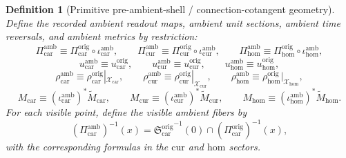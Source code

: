\documentclass[11pt]{article}
\newcommand{\TensorAmbientSpace}{\mathcal X_{\mathrm{car}}}
\newcommand{\CurAmbientSpace}{\mathcal X_{\mathrm{cur}}}
\newcommand{\HomAmbientSpace}{\mathcal X_{\mathrm{hom}}}
\newcommand{\TensorAmbientRead}{\Pi_{\mathrm{car}}^{\mathrm{amb}}}
\newcommand{\CurAmbientRead}{\Pi_{\mathrm{cur}}^{\mathrm{amb}}}
\newcommand{\HomAmbientRead}{\Pi_{\mathrm{hom}}^{\mathrm{amb}}}
\newcommand{\TensorAmbientUnit}{u_{\mathrm{car}}^{\mathrm{amb}}}
\newcommand{\CurAmbientUnit}{u_{\mathrm{cur}}^{\mathrm{amb}}}
\newcommand{\HomAmbientUnit}{u_{\mathrm{hom}}^{\mathrm{amb}}}
\newcommand{\TensorAmbientTimeRev}{\rho_{\mathrm{car}}^{\mathrm{amb}}}
\newcommand{\CurAmbientTimeRev}{\rho_{\mathrm{cur}}^{\mathrm{amb}}}
\newcommand{\HomAmbientTimeRev}{\rho_{\mathrm{hom}}^{\mathrm{amb}}}
\newcommand{\TensorAmbientMetric}{M_{\mathrm{car}}}
\newcommand{\CurAmbientMetric}{M_{\mathrm{cur}}}
\newcommand{\HomAmbientMetric}{M_{\mathrm{hom}}}
\newcommand{\TensorOriginRead}{\Pi_{\mathrm{car}}^{\mathrm{orig}}}
\newcommand{\CurOriginRead}{\Pi_{\mathrm{cur}}^{\mathrm{orig}}}
\newcommand{\HomOriginRead}{\Pi_{\mathrm{hom}}^{\mathrm{orig}}}
\newcommand{\TensorOriginUnit}{u_{\mathrm{car}}^{\mathrm{orig}}}
\newcommand{\CurOriginUnit}{u_{\mathrm{cur}}^{\mathrm{orig}}}
\newcommand{\HomOriginUnit}{u_{\mathrm{hom}}^{\mathrm{orig}}}
\newcommand{\TensorOriginTimeRev}{\rho_{\mathrm{car}}^{\mathrm{orig}}}
\newcommand{\CurOriginTimeRev}{\rho_{\mathrm{cur}}^{\mathrm{orig}}}
\newcommand{\HomOriginTimeRev}{\rho_{\mathrm{hom}}^{\mathrm{orig}}}
\newcommand{\TensorOriginSpaceMetric}{\widetilde M_{\mathrm{car}}}
\newcommand{\CurOriginSpaceMetric}{\widetilde M_{\mathrm{cur}}}
\newcommand{\HomOriginSpaceMetric}{\widetilde M_{\mathrm{hom}}}
\newcommand{\TensorOriginSection}{\mathfrak S_{\mathrm{car}}^{\mathrm{orig}}}
\newcommand{\TensorAmbientInc}{\iota_{\mathrm{car}}^{\mathrm{amb}}}
\newcommand{\CurAmbientInc}{\iota_{\mathrm{cur}}^{\mathrm{amb}}}
\newcommand{\HomAmbientInc}{\iota_{\mathrm{hom}}^{\mathrm{amb}}}
\newtheorem{definition}{Definition}
\begin{document}
\begin{definition}[Primitive pre-ambient-shell / connection-cotangent geometry]
Define the recorded ambient readout maps, ambient unit sections, ambient time reversals, and ambient metrics by restriction:
\begin{equation}
\TensorAmbientRead\equiv\TensorOriginRead\circ\TensorAmbientInc,\qquad
\CurAmbientRead\equiv\CurOriginRead\circ\CurAmbientInc,\qquad
\HomAmbientRead\equiv\HomOriginRead\circ\HomAmbientInc,
\label{eq:ambient_read_from_origin}
\end{equation}
\begin{equation}
\TensorAmbientUnit\equiv\TensorOriginUnit,\qquad
\CurAmbientUnit\equiv\CurOriginUnit,\qquad
\HomAmbientUnit\equiv\HomOriginUnit,
\label{eq:ambient_unit_from_origin}
\end{equation}
\begin{equation}
\TensorAmbientTimeRev\equiv\TensorOriginTimeRev|_{\TensorAmbientSpace},\qquad
\CurAmbientTimeRev\equiv\CurOriginTimeRev|_{\CurAmbientSpace},\qquad
\HomAmbientTimeRev\equiv\HomOriginTimeRev|_{\HomAmbientSpace},
\label{eq:ambient_time_rev_from_origin}
\end{equation}
\begin{equation}
\TensorAmbientMetric\equiv(\TensorAmbientInc)^*\TensorOriginSpaceMetric,\qquad
\CurAmbientMetric\equiv(\CurAmbientInc)^*\CurOriginSpaceMetric,\qquad
\HomAmbientMetric\equiv(\HomAmbientInc)^*\HomOriginSpaceMetric.
\label{eq:ambient_metric_from_origin}
\end{equation}
For each visible point, define the visible ambient fibers by
\begin{equation}
(\TensorAmbientRead)^{-1}(x)
=
{\TensorOriginSection}^{-1}(0)\cap(\TensorOriginRead)^{-1}(x),
\label{eq:ambient_fiber_from_origin_car}
\end{equation}
with the corresponding formulas in the \(\mathrm{cur}\) and \(\mathrm{hom}\) sectors.
\end{definition}
\end{document}
